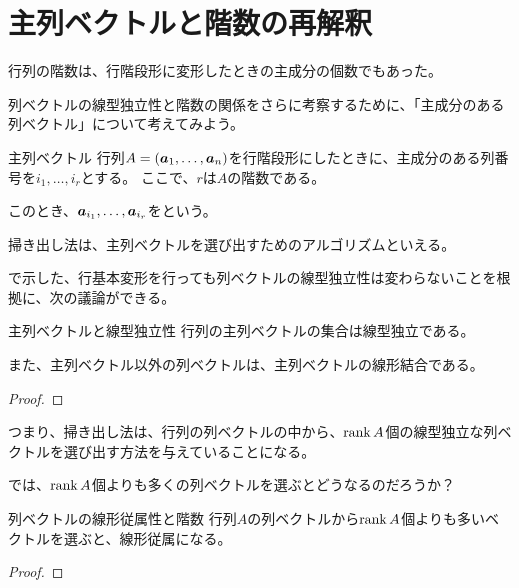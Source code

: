 \documentclass[../../../topic_linear-algebra]{subfiles}
\begin{document}
\sectionline
\section{主列ベクトルと階数の再解釈}

行列の階数は、行階段形に変形したときの主成分の個数でもあった。

列ベクトルの線型独立性と階数の関係をさらに考察するために、「主成分のある列ベクトル」について考えてみよう。

\begin{definition}{主列ベクトル}\label{def:pivot-columns}
  行列$A = (\vb*{a}_1, \dots, \vb*{a}_n)$を行階段形にしたときに、主成分のある列番号を$i_1,\dots, i_r$とする。
  ここで、$r$は$A$の階数である。

  このとき、$\vb*{a}_{i_1}, \dots, \vb*{a}_{i_r}$をという。
\end{definition}

掃き出し法は、主列ベクトルを選び出すためのアルゴリズムといえる。

\br

で示した、行基本変形を行っても列ベクトルの線型独立性は変わらないことを根拠に、次の議論ができる。

\begin{theorem*}{主列ベクトルと線型独立性}
  行列の主列ベクトルの集合は線型独立である。

  また、主列ベクトル以外の列ベクトルは、主列ベクトルの線形結合である。
\end{theorem*}

\begin{proof}
\end{proof}

\br

つまり、掃き出し法は、行列の列ベクトルの中から、$\rank A$個の線型独立な列ベクトルを選び出す方法を与えていることになる。

\br

では、$\rank A$個よりも多くの列ベクトルを選ぶとどうなるのだろうか？

\begin{theorem*}{列ベクトルの線形従属性と階数}
  行列$A$の列ベクトルから$\rank A$個よりも多いベクトルを選ぶと、線形従属になる。
\end{theorem*}

\begin{proof}
\end{proof}
\end{document}
